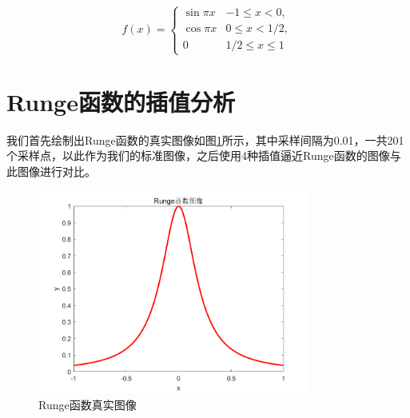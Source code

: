 \documentclass[a4paper]{article}
\begin{document}
\begin{equation}
\label{eq1}
f(x)=\left\{
\begin{array}{cc}
\sin \pi x & -1\le x< 0, \\
\cos \pi x & 0\le x< 1/2,\\
0 & 1/2\le x \le 1
\end{array}
\right.
\end{equation}

\section{Runge函数的插值分析}
我们首先绘制出Runge函数的真实图像如图\ref{fig:1}所示，其中采样间隔为0.01，一共201个采样点，以此作为我们的标准图像，之后使用4种插值逼近Runge函数的图像与此图像进行对比。

\begin{figure}[!h]
	\centering
	\includegraphics[width=0.8\textwidth]{../code/result/runge}
	\caption{\label{fig:1}Runge函数真实图像}
\end{figure}
\end{document}
